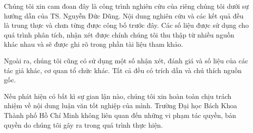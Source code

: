 \begin{declaration}
Chúng tôi xin cam đoan đây là công trình nghiên cứu của riêng chúng tôi dưới sự hướng dẫn của TS. Nguyễn Đức Dũng. Nội dung nghiên cứu và các kết quả đều là trung thực và chưa từng được công bố trước đây. Các số liệu được sử dụng cho quá trình phân tích, nhận xét được chính chúng tôi thu thập từ nhiều nguồn khác nhau và sẽ được ghi rõ trong phần tài liệu tham khảo.

Ngoài ra, chúng tôi cũng có sử dụng một số nhận xét, đánh giá và số liệu của các tác giả khác, cơ quan tổ chức khác. Tất cả đều có trích dẫn và chú thích nguồn gốc.

Nếu phát hiện có bất kì sự gian lận nào, chúng tôi xin hoàn toàn chịu trách nhiệm về nội dung luận văn tốt nghiệp của mình. Trường Đại học Bách Khoa Thành phố Hồ Chí Minh không liên quan đến những vi phạm tác quyền, bản quyền do chúng tôi gây ra trong quá trình thực hiện.

\end{declaration}